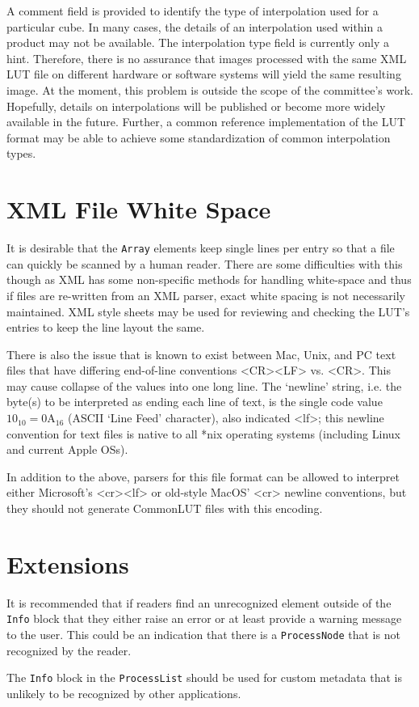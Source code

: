 A comment field is provided to identify the type of interpolation used for a particular cube. In many cases, the details of an interpolation used within a product may not be available. The interpolation type field is currently only a hint. Therefore, there is no assurance that images processed with the same XML LUT file on different hardware or software systems will yield the same resulting image. At the moment, this problem is outside the scope of the committee’s work. Hopefully, details on interpolations will be published or become more widely available in the future. Further, a common reference implementation of the LUT format may be able to achieve some standardization of common interpolation types.
 
\section{XML File White Space}
It is desirable that the \texttt{Array} elements keep single lines per entry so that a file can quickly be scanned by a human reader. There are some difficulties with this though as XML has some non-specific methods for handling white-space and thus if files are re-written from an XML parser, exact white spacing is not necessarily maintained. XML style sheets may be used for reviewing and checking the LUT's entries to keep the line layout the same.

There is also the issue that is known to exist between Mac, Unix, and PC text files that have differing end-of-line conventions \textless{}CR\textgreater{}\textless{}LF\textgreater{} vs. \textless{}CR\textgreater{}. This may cause collapse of the values into one long line. The `newline' string, i.e. the byte(s) to be interpreted as ending each line of text, is the single code value $10_{10} = 0\mathrm{A}_{16}$ (ASCII `Line Feed' character), also indicated \textless{}lf\textgreater{}; this newline convention for text files is native to all *nix operating systems (including Linux and current Apple OSs).

In addition to the above, parsers for this file format can be allowed to interpret either Microsoft's \textless{}cr\textgreater{}\textless{}lf\textgreater{} or old-style MacOS' \textless{}cr\textgreater{} newline conventions, but they should not generate CommonLUT files with this encoding.

\section{Extensions}
It is recommended that if readers find an unrecognized element outside of the \texttt{Info} block that they either raise an error or at least provide a warning message to the user. This could be an indication that there is a \texttt{ProcessNode} that is not recognized by the reader.

The \texttt{Info} block in the \texttt{ProcessList} should be used for custom metadata that is unlikely to be recognized by other applications.